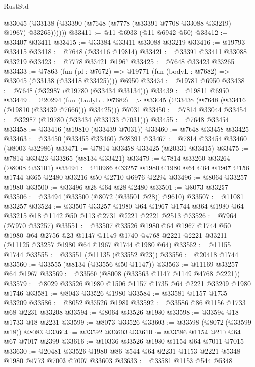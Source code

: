 \begin{lexlean}{RustStd}
\begin{coremodule}
{\begin{coremodule}
{{{{{{{{{{{{{{{{{{{{{{{{{{{{{{{{{{{{{{{{{{{{{{{{{{{{{        @33045 (@33138 (@33390 (@7648 (@7778 (@33391 @7708 @33088 @33219) @1967) @33265))))))
@33411 := @11 @6933 (@11 @6942 @50)
@33412 := @33407 @33411
@33415 := @33384 @33411 @33088 @33219
@33416 := @19793 @33415
@33418 := @7648 (@33416 @19814)
@33421 := @33391 @33411 @33088 @33219
@33423 := @7778 @33421 @1967
@33425 := @7648 @33423 @33265
@33433 := @7863
    (fun (pl : @7672) => @19771 (fun (bodyL : @7682) => @33045 (@33138 (@33418 @33425))))
    @6950
@33434 := @19781 @6950
@33438 := @7648 (@32987 (@19780 (@33434 @33134)))
@33439 := @19811 @6950
@33449 := @20294
    (fun (bodyL : @7682) => @33045 (@33438 (@7648 (@33416 (@19810 (@33439 @7666))) @33425)))
    @7031
@33450 := @7814 @33044
@33454 := @32987 (@19780 (@33434 (@33133 @7031)))
@33455 := @7648 @33454
@33458 := @33416 (@19810 (@33439 @7031))
@33460 := @7648 @33458 @33425
@33463 := @33450 (@33455 @33460) @28391
@33467 := @7814 @33454 @33460 (@8003 @32986)
@33471 := @7814 @33458 @33425 (@20331 @33415)
@33475 := @7814 @33423 @33265 (@8134 @33421)
@33479 := @7814 @33260 @33264 (@8008 @33101)
@33494 := @10986 @33257 @1980 @1980 @64 @64 @1967 @156 @1744 @365 @2480 @33216 @50 @2710 @6976 @2294
@33496 := @8064 @33257 @1980
@33500 := @33496 @28 @64 @28 @2480
@33501 := @8073 @33257
@33506 := @33494 (@33500 (@8072 (@33501 @28)) @9610)
@33507 := @11081 @33257
@33524 := @33507
    @33257
    @1980
    @64
    @1967
    @1744
    @364
    @1980
    @64
    @33215
    @18
    @1142
    @50
    @113
    @2731
    @2221
    @2221
    @2513
@33526 := @7964 (@7970 @33257)
@33551 := @33507
    @33526
    @1980
    @64
    @1967
    @1744
    @50
    @1980
    @64
    @2756
    @23
    @1147
    @1149
    @1740
    @4768
    @2221
    @2221
    @33211
    (@11125 @33257 @1980 @64 @1967 @1744 @1980 @64)
@33552 := @11155 @1744
@33555 := @33551 (@11135 (@33552 @23))
@33556 := @20418 @1744
@33560 := @33555 (@8134 (@33556 @50 @1147))
@33563 := @11169 @33257 @64 @1967
@33569 := @33560 (@8008 (@33563 @1147 @1149 @4768 @2221))
@33579 := @8029 @33526 @1980 @1506 @1157 @1735 @64 @2221 @33209 @1980 @1746
@33581 := @8043 @33526 @1980
@33584 := @33581 @1157 @1735 @33209
@33586 := @8052 @33526 @1980
@33592 := @33586 @86 @1156 @1733 @68 @2231 @33208
@33594 := @8064 @33526 @1980
@33598 := @33594 @18 @1733 @18 @2231
@33599 := @8073 @33526
@33603 := @33598 (@8072 (@33599 @18)) @8083
@33604 := @33592 @33603
@33610 := @33586 @1154 @210 @64 @67 @7017 @2399
@33616 := @10336 @33526 @1980 @1154 @64 @7011 @7015
@33630 := @20481 @33526 @1980 @86 @544 @64 @2231 @1153 @2221 @5348 @1980 @4773 @7003 @7007 @33603
@33633 := @33581 @1153 @544 @5348
}}}}}}}}}}}}}}}}}}}}}}}}}}}}}}}}}}}}}}}}}}}}}}}}}}}}}
\end{coremodule}}
\end{coremodule}
\end{lexlean}
